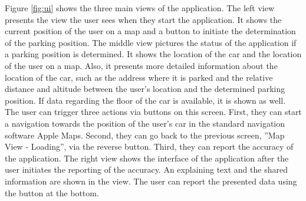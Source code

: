 Figure \ref{fig:ui} shows the three main views of the application. The left view presents the view the user sees when they start the application. It shows the current position of the user on a map and a button to initiate the determination of the parking position. The middle view pictures the status of the application if a parking position is determined. It shows the location of the car and the location of the user on a map. Also, it presents more detailed information about the location of the car, such as the address where it is parked and the relative distance and altitude between the user's location and the determined parking position. If data regarding the floor of the car is available, it is shown as well. The user can trigger three actions via buttons on this screen. First, they can start a navigation towards the position of the user's car in the standard navigation software Apple Maps. Second, they can go back to the previous screen, ''Map View - Loading'', via the reverse button. Third, they can report the accuracy of the application. The right view shows the interface of the application after the user initiates the reporting of the accuracy. An explaining text and the shared information are shown in the view. The user can report the presented data using the button at the bottom. 

